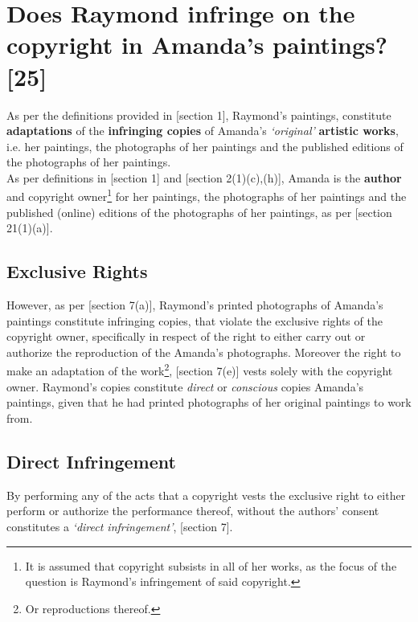 \documentclass[11pt]{article}
\begin{document}
\section{Does Raymond infringe on the copyright in Amanda's paintings? [25]}
\label{sec:org68c9e64}
As per the definitions provided in [section 1]\cite{rsa78_copyrightact},
Raymond's paintings, constitute \textbf{adaptations} of the \textbf{infringing copies} of
Amanda's \emph{`original'} \textbf{artistic works}, i.e. her paintings, the photographs
of her paintings and the published editions of the photographs of her
paintings.\\

As per definitions in [section 1]\cite{rsa78_copyrightact} and [section
2(1)(c),(h)]\cite{rsa78_copyrightact}, Amanda is the \textbf{author} and copyright
owner\footnote{It is assumed that copyright subsists in all of her works, as the
focus of the question is Raymond's infringement of said copyright.} for her
paintings, the photographs of her paintings and the published (online) editions
of the photographs of her paintings, as per [section
21(1)(a)]\cite{rsa78_copyrightact}.\\

\subsection{Exclusive Rights}
\label{sec:org4069f6a}

However, as per [section 7(a)]\cite{rsa78_copyrightact}, Raymond's printed
photographs of Amanda's paintings constitute infringing copies, that violate the
exclusive rights of the copyright owner, specifically in respect of the right to
either carry out or authorize the reproduction of the Amanda's
photographs. Moreover the right to make an adaptation of the work\footnote{Or
reproductions thereof.}, [section 7(e)]\cite{rsa78_copyrightact} vests solely with
the copyright owner. Raymond's copies constitute \emph{direct} or \emph{conscious} copies
Amanda's paintings, given that he had printed photographs of her original
paintings to work from.\\

\subsection{Direct Infringement}
\label{sec:org992c32b}
By performing any of the acts that a copyright vests the exclusive
right to either perform or authorize the performance thereof, without
the authors' consent constitutes a \emph{`direct infringement'}, [section
7]\cite{rsa78_copyrightact}.
\end{document}
